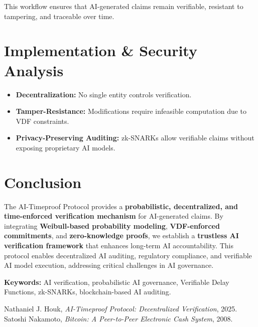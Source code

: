 \documentclass[12pt]{report}
\begin{document}
This workflow ensures that AI-generated claims remain verifiable, resistant to tampering, and traceable over time.

\section{Implementation \& Security Analysis}

\begin{itemize}
    \item \textbf{Decentralization:} No single entity controls verification.
    \item \textbf{Tamper-Resistance:} Modifications require infeasible computation due to VDF constraints.
    \item \textbf{Privacy-Preserving Auditing:} zk-SNARKs allow verifiable claims without exposing proprietary AI models.
\end{itemize}

\section{Conclusion}

The AI-Timeproof Protocol provides a \textbf{probabilistic, decentralized, and time-enforced verification mechanism} for AI-generated claims. By integrating \textbf{Weibull-based probability modeling}, \textbf{VDF-enforced commitments}, and \textbf{zero-knowledge proofs}, we establish a \textbf{trustless AI verification framework} that enhances long-term AI accountability. This protocol enables decentralized AI auditing, regulatory compliance, and verifiable AI model execution, addressing critical challenges in AI governance.

\bigskip
\noindent\textbf{Keywords:} AI verification, probabilistic AI governance, Verifiable Delay Functions, zk-SNARKs, blockchain-based AI auditing.

\begin{thebibliography}{9}
 Nathaniel J. Houk, \textit{AI-Timeproof Protocol: Decentralized Verification}, 2025.
 Satoshi Nakamoto, \textit{Bitcoin: A Peer-to-Peer Electronic Cash System}, 2008.
\end{thebibliography}
\end{document}
